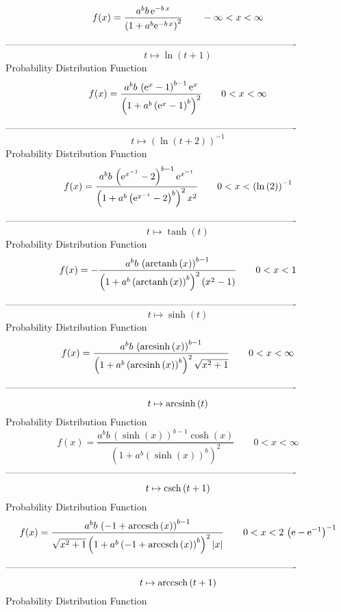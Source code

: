 \documentclass[12pt]{article}
\begin{document}
$$  f(x)={\frac {{a}^{b}b\,{{\rm e}^{-b\,x}}}{ \left( 1+{a}^{b}{{\rm e}^{-b\,x}
} \right) ^{2}}}
 \qquad-\infty 
 < x < \infty 
$$-------------------------------------------------------------------------------------------  \\$$t\mapsto \ln  \left( t+1 \right) 
$$Probability Distribution Function 
$$  f(x)={\frac {{a}^{b}b\, \left( {{\rm e}^{x}}-1 \right) ^{b-1}{{\rm e}^{x}}
}{ \left( 1+{a}^{b} \left( {{\rm e}^{x}}-1 \right) ^{b} \right) ^{2}}}
 \qquad0
 < x < \infty 
$$-------------------------------------------------------------------------------------------  \\$$t\mapsto  \left( \ln  \left( t+2 \right)  \right) ^{-1}
$$Probability Distribution Function 
$$  f(x)={\frac {{a}^{b}b\, \left( {{\rm e}^{{x}^{-1}}}-2 \right) ^{b-1}{
{\rm e}^{{x}^{-1}}}}{ \left( 1+{a}^{b} \left( {{\rm e}^{{x}^{-1}}}-2
 \right) ^{b} \right) ^{2}{x}^{2}}}
 \qquad0
 < x <  \left( \ln  \left( 2 \right)  \right) ^{-1}
$$-------------------------------------------------------------------------------------------  \\$$t\mapsto \tanh \left( t \right) 
$$Probability Distribution Function 
$$  f(x)=-{\frac {{a}^{b}b\, \left( {\rm arctanh} \left(x\right) \right) ^{b-1}
}{ \left( 1+{a}^{b} \left( {\rm arctanh} \left(x\right) \right) ^{b}
 \right) ^{2} \left( {x}^{2}-1 \right) }}
 \qquad0
 < x < 1
$$-------------------------------------------------------------------------------------------  \\$$t\mapsto \sinh \left( t \right) 
$$Probability Distribution Function 
$$  f(x)={\frac {{a}^{b}b\, \left( {\rm arcsinh} \left(x\right) \right) ^{b-1}
}{ \left( 1+{a}^{b} \left( {\rm arcsinh} \left(x\right) \right) ^{b}
 \right) ^{2}\sqrt {{x}^{2}+1}}}
 \qquad0
 < x < \infty 
$$-------------------------------------------------------------------------------------------  \\$$t\mapsto {\rm arcsinh} \left(t\right)
$$Probability Distribution Function 
$$  f(x)={\frac {{a}^{b}b\, \left( \sinh \left( x \right)  \right) ^{b-1}\cosh
 \left( x \right) }{ \left( 1+{a}^{b} \left( \sinh \left( x \right) 
 \right) ^{b} \right) ^{2}}}
 \qquad0
 < x < \infty 
$$-------------------------------------------------------------------------------------------  \\$$t\mapsto {\rm csch} \left(t+1\right)
$$Probability Distribution Function 
$$  f(x)={\frac {{a}^{b}b\, \left( -1+{\rm arccsch} \left(x\right) \right) ^{b-
1}}{\sqrt {{x}^{2}+1} \left( 1+{a}^{b} \left( -1+{\rm arccsch} \left(x
\right) \right) ^{b} \right) ^{2} \left| x \right| }}
 \qquad0
 < x < 2\, \left( {\rm e}-{{\rm e}^{-1}} \right) ^{-1}
$$-------------------------------------------------------------------------------------------  \\$$t\mapsto {\rm arccsch} \left(t+1\right)
$$Probability Distribution Function 
\end{document}
